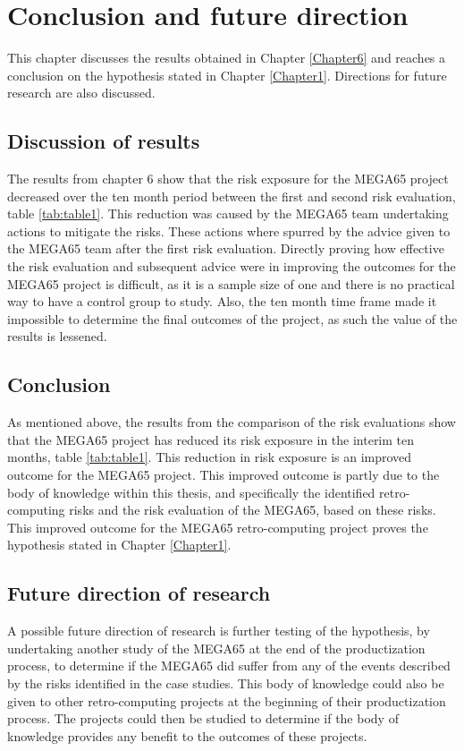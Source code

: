 
\chapter{Conclusion and future direction}
\label{Chapter7}
This chapter discusses the results obtained in Chapter \ref{Chapter6} and reaches a conclusion on the hypothesis stated in Chapter \ref{Chapter1}. Directions for future research are also discussed.

\section{Discussion of results}
The results from chapter 6 show that the risk exposure for the MEGA65 project decreased over the ten month period between the first and second risk evaluation, table \ref{tab:table1}. This reduction was caused by the MEGA65 team undertaking actions to mitigate the risks. These actions where spurred by the advice given to the MEGA65 team after the first risk evaluation. Directly proving how effective the risk evaluation and subsequent advice were in improving the outcomes for the MEGA65 project is difficult, as it is a sample size of one and there is no practical way to have a control group to study. Also, the ten month time frame made it impossible to determine the final outcomes of the project, as such the value of the results is lessened.

\section{Conclusion}
As mentioned above, the results from the comparison of the risk evaluations show that the MEGA65 project has reduced its risk exposure in the interim ten months, table \ref{tab:table1}. This reduction in risk exposure is an improved outcome for the MEGA65 project. This improved outcome is partly due to the body of knowledge within this thesis, and specifically the identified retro-computing risks and the risk evaluation of the MEGA65, based on these risks. This improved outcome for the MEGA65 retro-computing project proves the hypothesis stated in Chapter \ref{Chapter1}.

\section{Future direction of research}
A possible future direction of research is further testing of the hypothesis, by undertaking another study of the MEGA65 at the end of the productization process, to determine if the MEGA65 did suffer from any of the events described by the risks identified in the case studies. This body of knowledge could also be given to other retro-computing projects at the beginning of their productization process. The projects could then be studied to determine if the body of knowledge provides any benefit to the outcomes of these projects.

